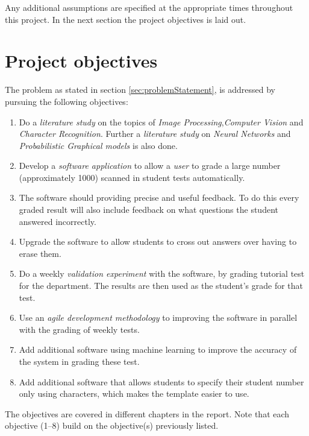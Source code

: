 Any additional assumptions are specified at the appropriate times throughout this project. In the next section the project objectives is laid out.


\section{Project objectives}
\label{sec:Objectives}

The problem as stated in section \ref{sec:problemStatement}, is addressed by pursuing the following objectives:
\begin{enumerate}
  \item Do a \textsl{literature study} on the topics of \textsl{Image Processing},\textsl{Computer Vision} and \textsl{Character Recognition}. Further a \textsl{literature study} on \textsl{Neural Networks} and \textsl{Probabilistic Graphical models} is also done.
  \item Develop a \textsl{software application} to allow a \textsl{user} to grade a large number (approximately 1000) scanned in student tests automatically.
\item The software should providing precise and useful feedback. To do this every graded result will also include feedback on what questions the student answered incorrectly.
\item Upgrade the software to allow students to cross out answers over having to erase them.
  \item Do a weekly \textsl{validation experiment} with the software, by grading tutorial test for the department. The results are then used as the student's grade for that test.
  \item Use an \textsl{agile development methodology} to improving the software in parallel with the grading of weekly tests.
  \item Add additional software using machine learning to improve the accuracy of the system in grading these test.
  \item Add additional software that allows students to specify their student number only using characters, which makes the template easier to use.
\end{enumerate}

The objectives are covered in different chapters in the report. Note that each objective (1--8) build on the objective(s) previously listed.


